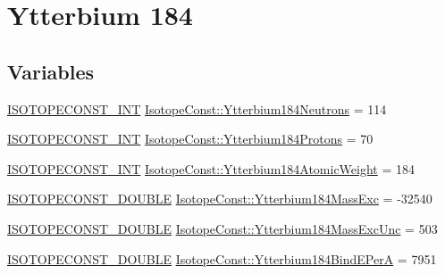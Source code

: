 \hypertarget{group___isotope_const-_ytterbium-_yb184}{}\section{Ytterbium 184}
\label{group___isotope_const-_ytterbium-_yb184}
\subsection*{Variables}
\begin{DoxyCompactItemize}
\item 
\mbox{\hyperlink{group___isotope_const-_macros_ga5f18360b3e99483a35c32d789e62621c}{I\+S\+O\+T\+O\+P\+E\+C\+O\+N\+S\+T\+\_\+\+I\+NT}} \mbox{\hyperlink{group___isotope_const-_ytterbium-_yb184_gac85d781e290a8338074d81993f844146}{Isotope\+Const\+::\+Ytterbium184\+Neutrons}} = 114
\item 
\mbox{\hyperlink{group___isotope_const-_macros_ga5f18360b3e99483a35c32d789e62621c}{I\+S\+O\+T\+O\+P\+E\+C\+O\+N\+S\+T\+\_\+\+I\+NT}} \mbox{\hyperlink{group___isotope_const-_ytterbium-_yb184_ga2e835e5ea41173a1d2745b9c27283096}{Isotope\+Const\+::\+Ytterbium184\+Protons}} = 70
\item 
\mbox{\hyperlink{group___isotope_const-_macros_ga5f18360b3e99483a35c32d789e62621c}{I\+S\+O\+T\+O\+P\+E\+C\+O\+N\+S\+T\+\_\+\+I\+NT}} \mbox{\hyperlink{group___isotope_const-_ytterbium-_yb184_ga9898caf4e12b7e987d639e0e9f840b2d}{Isotope\+Const\+::\+Ytterbium184\+Atomic\+Weight}} = 184
\item 
\mbox{\hyperlink{group___isotope_const-_macros_ga8f45a7272ce02c0b4c65c44636ed719a}{I\+S\+O\+T\+O\+P\+E\+C\+O\+N\+S\+T\+\_\+\+D\+O\+U\+B\+LE}} \mbox{\hyperlink{group___isotope_const-_ytterbium-_yb184_gafe21f338d5e83f16045d356426fb6b8b}{Isotope\+Const\+::\+Ytterbium184\+Mass\+Exc}} = -\/32540
\item 
\mbox{\hyperlink{group___isotope_const-_macros_ga8f45a7272ce02c0b4c65c44636ed719a}{I\+S\+O\+T\+O\+P\+E\+C\+O\+N\+S\+T\+\_\+\+D\+O\+U\+B\+LE}} \mbox{\hyperlink{group___isotope_const-_ytterbium-_yb184_gaa60a688830080ece87a16023b8516beb}{Isotope\+Const\+::\+Ytterbium184\+Mass\+Exc\+Unc}} = 503
\item 
\mbox{\hyperlink{group___isotope_const-_macros_ga8f45a7272ce02c0b4c65c44636ed719a}{I\+S\+O\+T\+O\+P\+E\+C\+O\+N\+S\+T\+\_\+\+D\+O\+U\+B\+LE}} \mbox{\hyperlink{group___isotope_const-_ytterbium-_yb184_ga95df41c9db2b1b13071678266b8db44d}{Isotope\+Const\+::\+Ytterbium184\+Bind\+E\+PerA}} = 7951
\item 

\end{DoxyCompactItemize}
